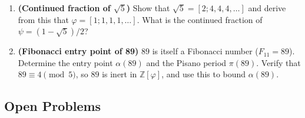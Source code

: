 \begin{enumerate}
\item \textbf{(Continued fraction of \(\sqrt{5}\))}  Show that
\(\sqrt{5} = [2; 4, 4, 4, \ldots]\) and derive from this that
\(\varphi = [1; 1, 1, 1, \ldots]\).  What is the continued fraction
of \(\psi = (1-\sqrt{5})/2\)?

\item \textbf{(Fibonacci entry point of 89)}  \(89\) is itself a Fibonacci
number (\(F_{11} = 89\)).  Determine the entry point \(\alpha(89)\) and the
Pisano period \(\pi(89)\).  Verify that \(89 \equiv 4 \pmod 5\), so
\(89\) is inert in \(\mathbb{Z}[\varphi]\), and use this to bound
\(\alpha(89)\).

\end{enumerate}

\subsection{Open Problems}\label{subsec:ch7-open}

